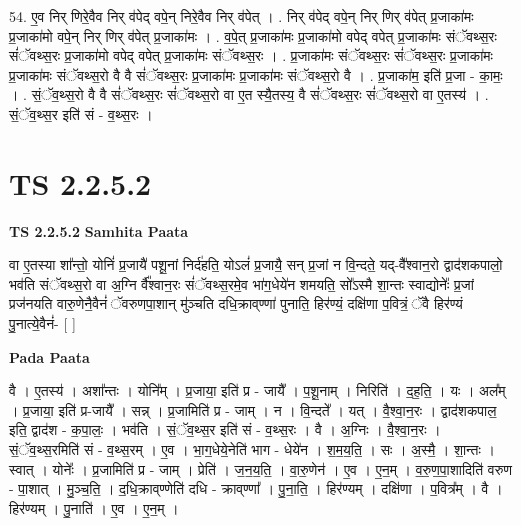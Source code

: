 \documentclass[17pt]{extarticle}
\begin{document}
54. ए॒व निर् णिरे॒वैव निर् व॑पेद् वपे॒न् निरे॒वैव निर् व॑पेत् । . निर् व॑पेद् वपे॒न् निर् णिर् व॑पेत् प्र॒जाका॑मः प्र॒जाका॑मो वपे॒न् निर् णिर् व॑पेत् प्र॒जाका॑मः । . व॒पे॒त् प्र॒जाका॑मः प्र॒जाका॑मो वपेद् वपेत् प्र॒जाका॑मः संॅवथ्स॒रः सं॑ॅवथ्स॒रः प्र॒जाका॑मो वपेद् वपेत् प्र॒जाका॑मः संॅवथ्स॒रः । . प्र॒जाका॑मः संॅवथ्स॒रः सं॑ॅवथ्स॒रः प्र॒जाका॑मः प्र॒जाका॑मः संॅवथ्स॒रो वै वै सं॑ॅवथ्स॒रः प्र॒जाका॑मः प्र॒जाका॑मः संॅवथ्स॒रो वै । . प्र॒जाका॑म॒ इति॑ प्र॒जा - का॒मः॒ । . सं॒ॅव॒थ्स॒रो वै वै सं॑ॅवथ्स॒रः सं॑ॅवथ्स॒रो वा ए॒त स्यै॒तस्य॒ वै सं॑ॅवथ्स॒रः सं॑ॅवथ्स॒रो वा ए॒तस्य॑ । . सं॒ॅव॒थ्स॒र इति॑ सं - व॒थ्स॒रः । \newline
\pagebreak
{}
\section*{ TS 2.2.5.2 }

\textbf{TS 2.2.5.2 } \newline
\textbf{Samhita Paata} \newline

वा ए॒तस्या शा᳚न्तो॒ योनिं॑ प्र॒जायै॑ पशू॒नां निर्द॑हति॒ योऽलं॑ प्र॒जायै॒ सन् प्र॒जां न वि॒न्दते॒ यद्-वै᳚श्वान॒रो द्वाद॑शकपालो॒ भव॑ति संॅवथ्स॒रो वा अ॒ग्नि र्वै᳚श्वान॒रः सं॑ॅवथ्स॒रमे॒व भा॑ग॒धेये॑न शमयति॒ सो᳚ऽस्मै शा॒न्तः स्वाद्योनेः᳚ प्र॒जां प्रज॑नयति वारु॒णेनै॒वैनं॑ ॅवरुणपा॒शान् मु॑ञ्चति दधि॒क्राव्‌ण्णा॑ पुनाति॒ हिर॑ण्यं॒ दक्षि॑णा प॒वित्रं॒ ॅवै हिर॑ण्यं पु॒नात्ये॒वैनं॑- [  ] \newline

\textbf{Pada Paata} \newline

वै । ए॒तस्य॑ । अशा᳚न्तः । योनि᳚म् । प्र॒जाया॒ इति॑ प्र - जायै᳚ । प॒शू॒नाम् । निरिति॑ । द॒ह॒ति॒ । यः । अल᳚म् । प्र॒जाया॒ इति॑ प्र-जायै᳚ । सन्न् । प्र॒जामिति॑ प्र - जाम् । न । वि॒न्दते᳚ । यत् । वै॒श्वा॒न॒रः । द्वाद॑शकपाल॒ इति॒ द्वाद॑श - क॒पा॒लः॒ । भव॑ति । सं॒ॅव॒थ्स॒र इति॑ सं - व॒थ्स॒रः । वै । अ॒ग्निः । वै॒श्वा॒न॒रः । सं॒ॅव॒थ्स॒रमिति॑ सं - व॒थ्स॒रम् । ए॒व । भा॒ग॒धेये॒नेति॑ भाग - धेये॑न । श॒म॒य॒ति॒ । सः । अ॒स्मै॒ । शा॒न्तः । स्वात् । योनेः᳚ । प्र॒जामिति॑ प्र - जाम् । प्रेति॑ । ज॒न॒य॒ति॒ । वा॒रु॒णेन॑ । ए॒व । ए॒न॒म् । व॒रु॒ण॒पा॒शादिति॑ वरुण - पा॒शात् । मु॒ञ्च॒ति॒ । द॒धि॒क्राव्‌ण्णेति॑ दधि - क्राव्‌ण्णा᳚ । पु॒ना॒ति॒ । हिर॑ण्यम् । दक्षि॑णा । प॒वित्र᳚म् । वै । हिर॑ण्यम् । पु॒नाति॑ । ए॒व । ए॒न॒म् ।  \newline
\end{document}
